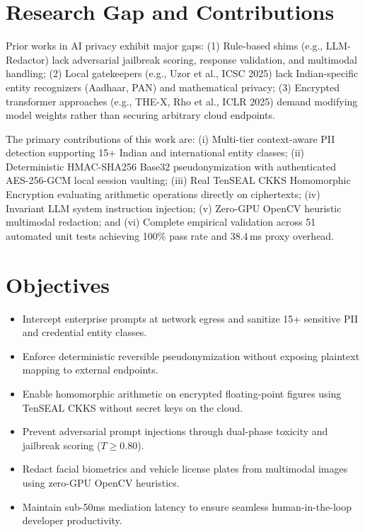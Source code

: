 \documentclass[10pt,a4paper]{article}
\begin{document}
\section{Research Gap and Contributions}
Prior works in AI privacy exhibit major gaps: (1) Rule-based shims (e.g., LLM-Redactor) lack adversarial jailbreak scoring, response validation, and multimodal handling; (2) Local gatekeepers (e.g., Uzor et al., ICSC 2025) lack Indian-specific entity recognizers (Aadhaar, PAN) and mathematical privacy; (3) Encrypted transformer approaches (e.g., THE-X, Rho et al., ICLR 2025) demand modifying model weights rather than securing arbitrary cloud endpoints.

The primary contributions of this work are: (i) Multi-tier context-aware PII detection supporting 15+ Indian and international entity classes; (ii) Deterministic HMAC-SHA256 Base32 pseudonymization with authenticated AES-256-GCM local session vaulting; (iii) Real TenSEAL CKKS Homomorphic Encryption evaluating arithmetic operations directly on ciphertexts; (iv) Invariant LLM system instruction injection; (v) Zero-GPU OpenCV heuristic multimodal redaction; and (vi) Complete empirical validation across 51 automated unit tests achieving 100\% pass rate and 38.4\,ms proxy overhead.

\section{Objectives}
\begin{itemize}[leftmargin=*,noitemsep]
    \item Intercept enterprise prompts at network egress and sanitize 15+ sensitive PII and credential entity classes.
    \item Enforce deterministic reversible pseudonymization without exposing plaintext mapping to external endpoints.
    \item Enable homomorphic arithmetic on encrypted floating-point figures using TenSEAL CKKS without secret keys on the cloud.
    \item Prevent adversarial prompt injections through dual-phase toxicity and jailbreak scoring ($T \ge 0.80$).
    \item Redact facial biometrics and vehicle license plates from multimodal images using zero-GPU OpenCV heuristics.
    \item Maintain sub-50ms mediation latency to ensure seamless human-in-the-loop developer productivity.
\end{itemize}
\end{document}
